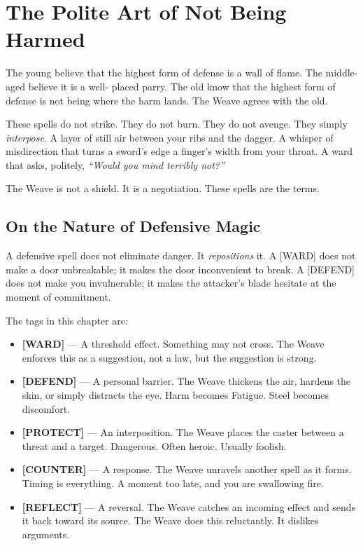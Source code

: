 \section{The Polite Art of Not Being Harmed}

The young believe that the highest form of defense is a wall of flame. The middle-aged believe it is a well- placed parry. The old know that the highest form of defense is not being where the harm lands. The Weave agrees with the old.

These spells do not strike. They do not burn. They do not avenge. They simply \emph{interpose}. A layer of still air between your ribs and the dagger. A whisper of misdirection that turns a sword's edge a finger's width from your throat. A ward that asks, politely, \emph{``Would you mind terribly not?''}

The Weave is not a shield. It is a negotiation. These spells are the terms.

\subsection{On the Nature of Defensive Magic}

A defensive spell does not eliminate danger. It \emph{repositions} it. A [WARD] does not make a door unbreakable; it makes the door inconvenient to break. A [DEFEND] does not make you invulnerable; it makes the attacker's blade hesitate at the moment of commitment.

The tags in this chapter are:

\begin{itemize}
    \item \textbf{[WARD]} --- A threshold effect. Something may not cross. The Weave enforces this as a suggestion, not a law, but the suggestion is strong.
    \item \textbf{[DEFEND]} --- A personal barrier. The Weave thickens the air, hardens the skin, or simply distracts the eye. Harm becomes Fatigue. Steel becomes discomfort.
    \item \textbf{[PROTECT]} --- An interposition. The Weave places the caster between a threat and a target. Dangerous. Often heroic. Usually foolish.
    \item \textbf{[COUNTER]} --- A response. The Weave unravels another spell as it forms. Timing is everything. A moment too late, and you are swallowing fire.
    \item \textbf{[REFLECT]} --- A reversal. The Weave catches an incoming effect and sends it back toward its source. The Weave does this reluctantly. It dislikes arguments.
\end{itemize}

